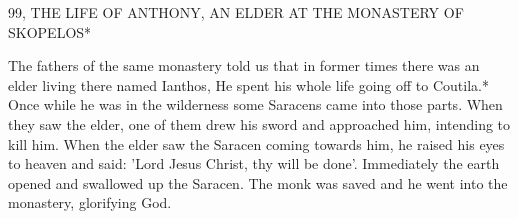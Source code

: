 99, THE LIFE OF ANTHONY, AN ELDER AT THE
MONASTERY OF SKOPELOS*

The fathers of the same monastery told us that in former times there
was an elder living there named Ianthos, He spent his whole life
going off to Coutila.* Once while he was in the wilderness some
Saracens came into those parts. When they saw the elder, one of
them drew his sword and approached him, intending to kill him.
When the elder saw the Saracen coming towards him, he raised his
eyes to heaven and said: 'Lord Jesus Christ, thy will be done'.
Immediately the earth opened and swallowed up the Saracen. The
monk was saved and he went into the monastery, glorifying God.

